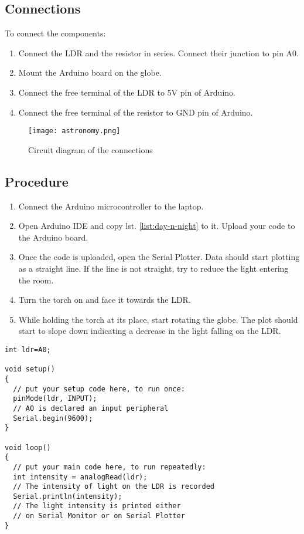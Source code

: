 \subsection*{Connections}
To connect the components:
\begin{enumerate}\itemsep0em
    \item Connect the LDR and the resistor in series. Connect their junction to pin A0.
    \item Mount the Arduino board on the globe.
    \item Connect the free terminal of the LDR to 5V pin of Arduino.
    \item Connect the free terminal of the resistor to GND pin of Arduino.
\end{enumerate}
	\begin{figure}[H]
	\centering \texttt{[image: astronomy.png]}
	\caption{Circuit diagram of the connections}
	\end{figure}

\subsection*{Procedure}
\begin{enumerate}
    \item Connect the Arduino microcontroller to the laptop. 
    \item Open Arduino IDE and copy lst. \ref{list:day-n-night} to it. Upload your code to the Arduino board.
    \item Once the code is uploaded, open the Serial Plotter. Data should start plotting as a straight line. If the line is not straight, try to reduce the light entering the room.
    \item Turn the torch on and face it towards the LDR. 
    \item While holding the torch at its place, start rotating the globe. The plot should start to slope down indicating a decrease in the light falling on the LDR.
\end{enumerate}
\begin{lstlisting}[language=Arduino, numbers=none, caption={Arduino code for reading the variation in LDR resistance}, captionpos=b, label={list:day-n-night}, breaklines=true]
int ldr=A0;  

void setup() 
{
  // put your setup code here, to run once:
  pinMode(ldr, INPUT);    
  // A0 is declared an input peripheral
  Serial.begin(9600);
}

void loop() 
{
  // put your main code here, to run repeatedly:
  int intensity = analogRead(ldr);  
  // The intensity of light on the LDR is recorded
  Serial.println(intensity);        
  // The light intensity is printed either 
  // on Serial Monitor or on Serial Plotter
}
\end{lstlisting}
